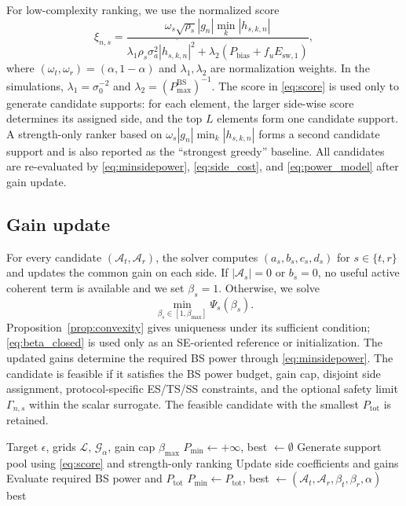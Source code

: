 \documentclass[journal]{IEEEtran}
\begin{document}
For low-complexity ranking, we use the normalized score
\begin{equation}
\xi_{n,s}=
\frac{\omega_s\sqrt{\rho_s}|g_n|\min_k|h_{s,k,n}|}
{\lambda_1\rho_s\sigma_a^2\overline{|h_{s,k,n}|^2}
+\lambda_2(P_{\mathrm{bias}}+f_uE_{\mathrm{sw},1})},
\label{eq:score}
\end{equation}
where $(\omega_t,\omega_r)=(\alpha,1-\alpha)$ and $\lambda_1,\lambda_2$ are normalization weights. In the simulations, $\lambda_1=\sigma_0^{-2}$ and $\lambda_2=(P_{\max}^{\mathrm{BS}})^{-1}$. The score in \eqref{eq:score} is used only to generate candidate supports: for each element, the larger side-wise score determines its assigned side, and the top $L$ elements form one candidate support. A strength-only ranker based on $\omega_s|g_n|\min_k|h_{s,k,n}|$ forms a second candidate support and is also reported as the ``strongest greedy'' baseline. All candidates are re-evaluated by \eqref{eq:minsidepower}, \eqref{eq:side_cost}, and \eqref{eq:power_model} after gain update.

\subsection{Gain update}
For every candidate $(\mathcal{A}_t,\mathcal{A}_r)$, the solver computes $(a_s,b_s,c_s,d_s)$ for $s\in\{t,r\}$ and updates the common gain on each side. If $|\mathcal{A}_s|=0$ or $b_s=0$, no useful active coherent term is available and we set $\beta_s=1$. Otherwise, we solve
\[
\min_{\beta_s\in[1,\beta_{\max}]}\Psi_s(\beta_s).
\]
Proposition~\ref{prop:convexity} gives uniqueness under its sufficient condition; \eqref{eq:beta_closed} is used only as an SE-oriented reference or initialization. The updated gains determine the required BS power through \eqref{eq:minsidepower}. The candidate is feasible if it satisfies the BS power budget, gain cap, disjoint side assignment, protocol-specific ES/TS/SS constraints, and the optional safety limit $\Gamma_{n,s}$ within the scalar surrogate. The feasible candidate with the smallest $P_{\mathrm{tot}}$ is retained.

\begin{algorithm}[t]
\caption{Sparse-Activation Solver}
\label{alg:solver}
\begin{algorithmic}[1]
\Require Target $\epsilon$, grids $\mathcal{L}$, $\mathcal{G}_\alpha$, gain cap $\beta_{\max}$
\State $P_{\min}\gets+\infty$, best $\gets\emptyset$
    \State Generate support pool using \eqref{eq:score} and strength-only ranking
        \State Update side coefficients and gains
        \State Evaluate required BS power and $P_{\mathrm{tot}}$
            \State $P_{\min}\gets P_{\mathrm{tot}}$, best $\gets(\mathcal{A}_t,\mathcal{A}_r,\beta_t,\beta_r,\alpha)$
        \EndIf
    \EndFor
\EndFor
\State \Return best
\end{algorithmic}
\end{algorithm}
\end{document}
